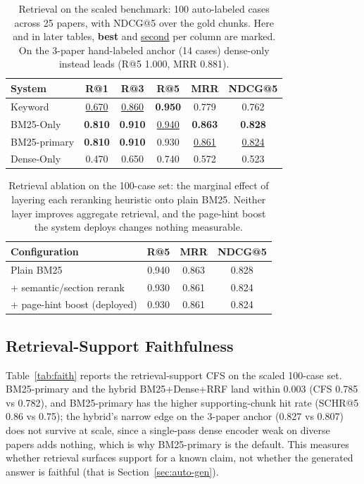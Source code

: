 \documentclass[11pt,letterpaper]{article}
\newcommand{\best}[1]{\textbf{#1}}
\newcommand{\snd}[1]{\underline{#1}}
\begin{document}
\begin{table}[t]
  \centering
  \caption{Retrieval on the scaled benchmark: 100 auto-labeled cases across 25 papers,
           with NDCG@5 over the gold chunks. Here and in later tables, \best{best} and
           \snd{second} per column are marked. On the 3-paper hand-labeled anchor (14 cases)
           dense-only instead leads (R@5 1.000, MRR 0.881).}
  \label{tab:retrieval}
  \setlength{\tabcolsep}{3pt}
  \begin{tabular}{lccccc}
    \toprule
    \textbf{System} & \textbf{R@1} & \textbf{R@3} & \textbf{R@5} & \textbf{MRR} & \textbf{NDCG@5} \\
    \midrule
    Keyword         & \snd{0.670} & \snd{0.860} & \best{0.950} & 0.779 & 0.762 \\
    BM25-Only       & \best{0.810} & \best{0.910} & \snd{0.940} & \best{0.863} & \best{0.828} \\
    BM25-primary    & \best{0.810} & \best{0.910} & 0.930 & \snd{0.861} & \snd{0.824} \\
    Dense-Only      & 0.470 & 0.650 & 0.740 & 0.572 & 0.523 \\
    \bottomrule
  \end{tabular}
\end{table}

\begin{table}[t]
  \centering
  \caption{Retrieval ablation on the 100-case set: the marginal effect of layering each reranking
           heuristic onto plain BM25. Neither layer improves aggregate retrieval, and the page-hint
           boost the system deploys changes nothing measurable.}
  \label{tab:retrieval-ablation}
  \setlength{\tabcolsep}{3pt}
  \begin{tabular}{lccc}
    \toprule
    \textbf{Configuration} & \textbf{R@5} & \textbf{MRR} & \textbf{NDCG@5} \\
    \midrule
    Plain BM25                      & 0.940 & 0.863 & 0.828 \\
    \; + semantic/section rerank    & 0.930 & 0.861 & 0.824 \\
    \; + page-hint boost (deployed) & 0.930 & 0.861 & 0.824 \\
    \bottomrule
  \end{tabular}
\end{table}

\subsection{Retrieval-Support Faithfulness}
\label{sec:auto-faith}
Table~\ref{tab:faith} reports the retrieval-support CFS on the scaled 100-case set. BM25-primary
and the hybrid BM25+Dense+RRF land within 0.003 (CFS 0.785 vs 0.782), and BM25-primary has the
higher supporting-chunk hit rate (SCHR@5 0.86 vs 0.75); the hybrid's narrow edge on the 3-paper
anchor (0.827 vs 0.807) does not survive at scale, since a single-pass dense encoder weak on diverse
papers adds nothing, which is why BM25-primary is the default. This measures whether retrieval
surfaces support for a known claim, not whether the generated answer is faithful (that is
Section~\ref{sec:auto-gen}).
\end{document}
